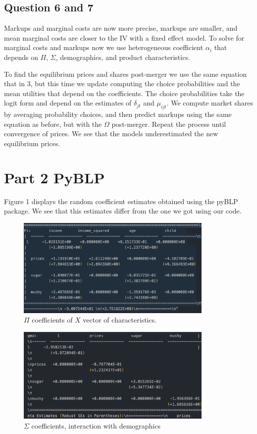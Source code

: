 \documentclass{article}
\theoremstyle{definition}
\begin{document}
\subsection*{Question 6 and 7}

Markups and marginal costs are now more precise, markups are smaller, and mean marginal costs are closer to the IV with a fixed effect model. To solve for marginal costs and markups now we use heterogeneous coefficient $\alpha_i$ that depends on $\Pi$, $\Sigma$, demographics, and product characteristics.

To find the equilibrium prices and shares post-merger we use the same equation that in 3, but this time we update computing the choice probabilities and the mean utilities that depend on the coefficients. The choice probabilities take the logit form and depend on the estimates of $\delta_{jt}$ and $\mu_{ijt}$. We compute market shares by averaging probability choices, and then predict markups using the same equation as before, but with the $\Omega$ post-merger. Repeat the process until convergence of prices. We see that the models underestimated the new equilibrium prices.



\section*{Part 2 PyBLP}

Figure 1 displays the random coefficient estimates obtained using the pyBLP package. We see that this estimates differ from the one we got using our code. 
\begin{figure}[h]
\centering
\includegraphics[width=9.5cm]{imgs/pi_py.png}
\caption{$\Pi$ coefficients of $X$ vector of characteristics.}
\end{figure}

\begin{figure}[h]
\centering
\includegraphics[width=9.5cm]{imgs/sigma_py.png}
\caption{$\Sigma$ coefficients, interaction with demographics}
\end{figure}
\end{document}
